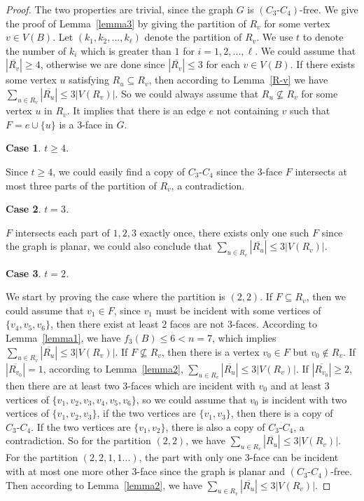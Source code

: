 \documentclass[12pt]{article}
\newtheorem{case}{Case}[section]
\begin{document}
\begin{proof}
    
    The two properties are trivial, since the graph $G$ is $(C_3\text{-}C_4)$-free. We give the proof of Lemma~\ref{lemma3} by giving the partition of $R_v$ for some vertex $v\in V(B)$. Let $(k_1,k_2,...,k_\ell)$ denote the partition of $R_v$. We use $t$ to denote the number of $k_i$ which is greater than $1$ for $i=1,2,...,\ell$. We could assume that $|\overline{R_v}|\geq 4$, otherwise we are done since $|\overline{R_v}|\leq 3$ for each $v\in V(B)$. If there exists some vertex $u$ satisfying $R_u \subseteq R_v$, then according to Lemma~\ref{R-v} we have $\sum_{u \in R_v}|\overline{R_u}| \leq 3|V(R_v)|$. So we could always assume that $R_u\not\subseteq R_v$ for some vertex $u$ in $R_v$. It implies that there is an edge $e$ not containing $v$ such that $F=e\cup \{u\}$ is a $3$-face in $G$.
    
    \begin{case}
        $t\geq4$.
    \end{case}
    
    Since $t \geq 4$, we could easily find a copy of $C_3\text{-}C_4$ since the $3$-face $F$ intersects at most three parts of the partition of $R_v$, a contradiction.
    
    \begin{case}
        $t=3$.
    \end{case}
    
    $F$ intersects each part of $1,2,3$ exactly once, there exists only one such $F$ since the graph is planar, we could also conclude that $\sum_{u \in R_v}|\overline{R_u}| \leq 3|V(R_v)|.$
    
    \begin{case}
        $t=2$.
    \end{case}
    
    We start by proving the case where the partition is $(2,2)$. If $F\subseteq R_v$, then we could assume that $v_1 \in F$, since $v_1$ must be incident with some vertices of $\{v_4,v_5,v_6\}$, then there exist at least $2$ faces are not $3$-faces. According to Lemma~\ref{lemma1}, we have $f_3(B)\leq 6<n=7$, which implies $\sum_{u \in R_v}|\overline{R_u}| \leq 3|V(R_v)|$. If $F\not\subseteq R_v$, then there is a vertex $v_0\in F$ but $v_0 \not\in R_v$. If $|\overline{R_{v_0}}|=1$, according to Lemma~\ref{lemma2}, $\sum_{u \in R_v}|\overline{R_u}| \leq 3|V(R_v)|$. If $|\overline{R_{v_0}}|\geq2$, then there are at least two $3$-faces which are incident with $v_0$ and at least $3$ vertices of $\{v_1,v_2,v_3,v_4,v_5,v_6\}$, so we could assume that $v_0$ is incident with two vertices of $\{v_1,v_2,v_3\}$, if the two vertices are $\{v_1,v_3\}$, then there is a copy of $C_3\text{-}C_4$. If the two vertices are $\{v_1,v_2\}$, there is also a copy of $C_3\text{-}C_4$, a contradiction. So for the partition $(2,2)$, we have $\sum_{u \in R_v}|\overline{R_u}| \leq 3|V(R_v)|$. For the partition $(2,2,1,1...)$, the part with only one $3$-face can be incident with at most one more other $3$-face since the graph is planar and $(C_3\text{-}C_4)$-free. Then according to Lemma~\ref{lemma2}, we have $\sum_{u \in R_v}|\overline{R_u}| \leq 3|V(R_v)|$.
    

\end{proof}
\end{document}

